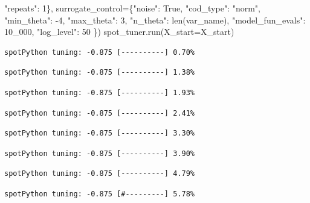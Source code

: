 \documentclass[
  letterpaper,
  DIV=11,
  numbers=noendperiod]{scrreprt}
\newenvironment{Shaded}{\begin{snugshade}}{\end{snugshade}}
\newcommand{\BuiltInTok}[1]{\textcolor[rgb]{0.00,0.23,0.31}{#1}}
\newcommand{\DecValTok}[1]{\textcolor[rgb]{0.68,0.00,0.00}{#1}}
\newcommand{\NormalTok}[1]{\textcolor[rgb]{0.00,0.23,0.31}{#1}}
\newcommand{\OperatorTok}[1]{\textcolor[rgb]{0.37,0.37,0.37}{#1}}
\newcommand{\StringTok}[1]{\textcolor[rgb]{0.13,0.47,0.30}{#1}}
\newcommand{\VariableTok}[1]{\textcolor[rgb]{0.07,0.07,0.07}{#1}}
\begin{document}
\begin{Shaded}
\begin{Highlighting}[]
                                   \StringTok{"repeats"}\NormalTok{: }\DecValTok{1}\NormalTok{\},}
\NormalTok{                   surrogate\_control}\OperatorTok{=}\NormalTok{\{}\StringTok{"noise"}\NormalTok{: }\VariableTok{True}\NormalTok{,}
                                      \StringTok{"cod\_type"}\NormalTok{: }\StringTok{"norm"}\NormalTok{,}
                                      \StringTok{"min\_theta"}\NormalTok{: }\OperatorTok{{-}}\DecValTok{4}\NormalTok{,}
                                      \StringTok{"max\_theta"}\NormalTok{: }\DecValTok{3}\NormalTok{,}
                                      \StringTok{"n\_theta"}\NormalTok{: }\BuiltInTok{len}\NormalTok{(var\_name),}
                                      \StringTok{"model\_fun\_evals"}\NormalTok{: }\DecValTok{10\_000}\NormalTok{,}
                                      \StringTok{"log\_level"}\NormalTok{: }\DecValTok{50}
\NormalTok{                                      \})}
\NormalTok{spot\_tuner.run(X\_start}\OperatorTok{=}\NormalTok{X\_start)}
\end{Highlighting}
\end{Shaded}

\begin{verbatim}
spotPython tuning: -0.875 [----------] 0.70% 
\end{verbatim}

\begin{verbatim}
spotPython tuning: -0.875 [----------] 1.38% 
\end{verbatim}

\begin{verbatim}
spotPython tuning: -0.875 [----------] 1.93% 
\end{verbatim}

\begin{verbatim}
spotPython tuning: -0.875 [----------] 2.41% 
\end{verbatim}

\begin{verbatim}
spotPython tuning: -0.875 [----------] 3.30% 
\end{verbatim}

\begin{verbatim}
spotPython tuning: -0.875 [----------] 3.90% 
\end{verbatim}

\begin{verbatim}
spotPython tuning: -0.875 [----------] 4.79% 
\end{verbatim}

\begin{verbatim}
spotPython tuning: -0.875 [#---------] 5.78% 
\end{verbatim}
\end{document}

